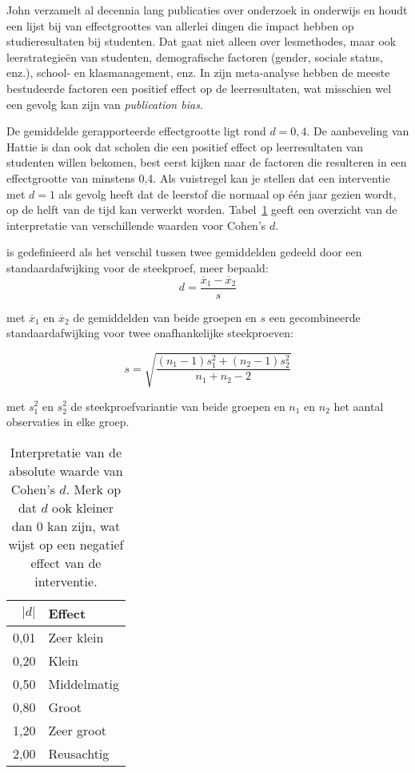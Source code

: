 John \textcite{Hattie2012} verzamelt al decennia lang publicaties over onderzoek in onderwijs en houdt een lijst bij van effectgroottes van allerlei dingen die impact hebben op studieresultaten bij studenten. Dat gaat niet alleen over lesmethodes, maar ook leerstrategieën van studenten, demografische factoren (gender, sociale status, enz.), school- en klasmanagement, enz. In zijn meta-analyse hebben de meeste bestudeerde factoren een positief effect op de leerresultaten, wat misschien wel een gevolg kan zijn van \emph{publication bias}. 

De gemiddelde gerapporteerde effectgrootte ligt rond $d = 0,4$. De aanbeveling van Hattie is dan ook dat scholen die een positief effect op leerresultaten van studenten willen bekomen, best eerst kijken naar de factoren die resulteren in een effectgrootte van minstens 0,4. Als vuistregel kan je stellen dat een interventie met $d = 1$ als gevolg heeft dat de leerstof die normaal op één jaar gezien wordt, op de helft van de tijd kan verwerkt worden. Tabel~\ref{table:effectgrootte} geeft een overzicht van de interpretatie van verschillende waarden voor Cohen's $d$.

\begin{definition}[Cohen's $d$]
  is gedefinieerd als het verschil tussen twee gemiddelden gedeeld door een standaardafwijking voor de steekproef, meer bepaald:
  \begin{equation}
  d = \frac{\overline{x}_1 - \overline{x}_2}{s}
  \end{equation}
  
  met $\overline{x}_1$ en $\overline{x}_2$ de gemiddelden van beide groepen en $s$ een gecombineerde standaardafwijking voor twee onafhankelijke steekproeven:
  
  \begin{equation}
  s = \sqrt{\frac{(n_1 - 1) s_1^2 + (n_2 - 1) s_2^2}{n_1 + n_2 - 2}}
  \end{equation}
  
  met $s_1^2$ en $s_2^2$ de steekproefvariantie van beide groepen en $n_1$ en $n_2$ het aantal observaties in elke groep.
\end{definition}

\begin{table}
  \centering
  \begin{tabular}{rl}
    \toprule
    \textbf{$|d|$} & \textbf{Effect} \\
    \midrule
    0,01 & Zeer klein \\
    0,20 & Klein \\
    0,50 & Middelmatig \\
    0,80 & Groot \\
    1,20 & Zeer groot \\
    2,00 & Reusachtig \\
    \bottomrule
  \end{tabular}
  \caption{Interpretatie van de absolute waarde van Cohen's $d$. Merk op dat $d$ ook kleiner dan 0 kan zijn, wat wijst op een negatief effect van de interventie.}
  \label{table:effectgrootte}
\end{table}

